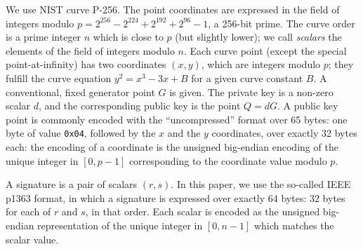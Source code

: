 \documentclass{llncs}
\begin{document}
We use NIST curve P-256. The point coordinates are expressed in the
field of integers modulo $p = 2^{256} - 2^{224} + 2^{192} + 2^{96} - 1$,
a 256-bit prime. The curve order is a prime integer $n$ which is close
to $p$ (but slightly lower); we call \emph{scalars} the elements of the
field of integers modulo $n$. Each curve point (except the special
point-at-infinity) has two coordinates $(x,y)$, which are integers
modulo $p$; they fulfill the curve equation $y^2 = x^3 - 3x + B$ for a
given curve constant $B$. A conventional, fixed generator point $G$ is
given. The private key is a non-zero scalar $d$, and the corresponding
public key is the point $Q = dG$. A public key point is commonly encoded
with the ``uncompressed'' format over 65 bytes: one byte of value
\verb+0x04+, followed by the $x$ and the $y$ coordinates, over exactly
32 bytes each: the encoding of a coordinate is the unsigned big-endian
encoding of the unique integer in $[0, p-1]$ corresponding to the
coordinate value modulo $p$.

A signature is a pair of scalars $(r,s)$. In this paper, we use the
so-called IEEE p1363 format, in which a signature is expressed over
exactly 64 bytes: 32 bytes for each of $r$ and $s$, in that order. Each
scalar is encoded as the unsigned big-endian representation of the
unique integer in $[0, n-1]$ which matches the scalar value.
\end{document}
